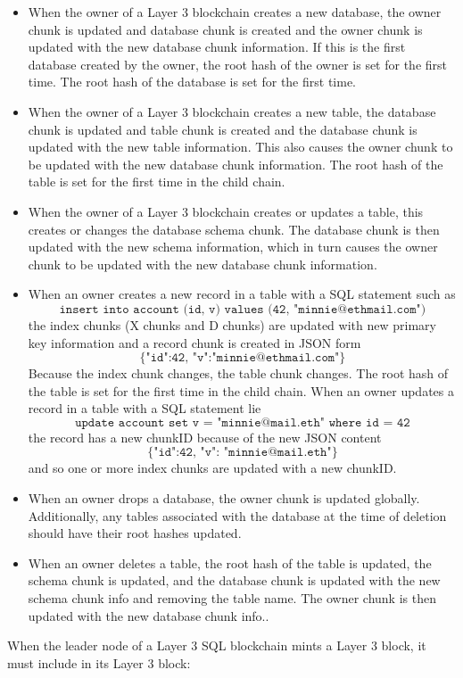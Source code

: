 \documentclass{article}
\newcommand{\sql}[1]{\texttt{#1}}
\newcommand{\json}[1]{\{\texttt{#1}\}}
\begin{document}
\begin{itemize}
\item When the owner of a Layer 3 blockchain creates a new database, the owner chunk is updated and  database chunk is created and the owner chunk is updated with the new database chunk information. If this is the first database created by the owner, the root hash of the owner is set for the first time. The root hash of the database is set for the first time.
\item When the owner of a Layer 3 blockchain creates a new table, the database chunk is updated and table chunk is created and the database chunk is updated with the new table information.  This also causes the owner chunk to be updated with the new database chunk information.  The root hash of the table is set for the first time in the child chain.
\item When the owner of a Layer 3 blockchain creates or updates a table, this creates or changes the database schema chunk.  The database chunk is then updated with the new schema information, which in turn causes the owner chunk to be updated with the new database chunk information. 
\item When an owner creates a new record in a table with a SQL statement such as
\[
\sql{insert into account (id, v) values (42, "minnie@ethmail.com")}
\]
the index chunks (X chunks and D chunks) are updated with new primary key information and a record chunk is created in JSON form 
\[
\json{{"id":42, "v":"minnie@ethmail.com"}}
\]
Because the index chunk changes, the table chunk changes. The root hash of the table is set for the first time in the child chain.
When an owner updates a record in a table with a SQL statement lie
\[
\sql{update account set v = "minnie@mail.eth" where id = 42}
\]
the record has a new chunkID because of the new JSON content
\[
\json{{"id":42, "v": "minnie@mail.eth"}}
\]
and so one or more index chunks are updated with a new chunkID.
\item When an owner drops a database, the owner chunk is updated globally.  Additionally, any tables associated with the database at the time of deletion should have their root hashes updated.
\item When an owner deletes a table, the root hash of the table is updated, the schema chunk is updated, and the database chunk is updated with the new schema chunk info and removing the table name.  The owner chunk is then updated with the new database chunk info..
\end{itemize}
When the leader node of a Layer 3 SQL blockchain mints a Layer 3 block, it must include in its Layer 3 block:
\end{document}
